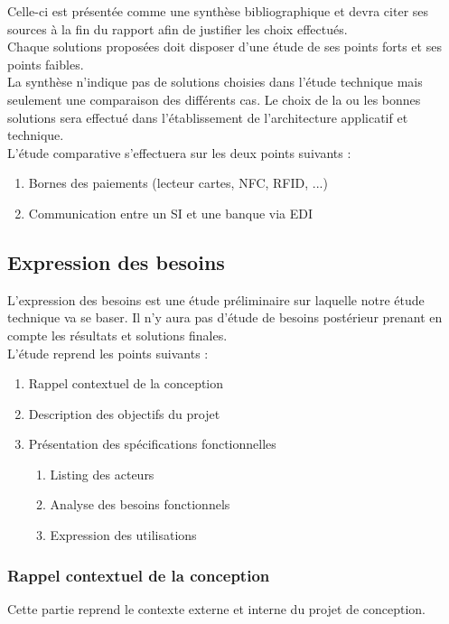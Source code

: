 Celle-ci est présentée comme une synthèse bibliographique et devra citer ses
sources à la fin du rapport afin de justifier les choix effectués. \\

Chaque solutions proposées doit disposer d'une étude de ses points forts et ses
points faibles. \\

La synthèse n'indique pas de solutions choisies dans l'étude technique mais
seulement une comparaison des différents cas. Le choix de la ou les bonnes
solutions sera effectué dans l'établissement de l'architecture applicatif et
technique. \\

L'étude comparative s'effectuera sur les deux points suivants :
\begin{enumerate}
  \item Bornes des paiements (lecteur cartes, NFC, RFID, ...)
  \item Communication entre un SI et une banque via EDI
\end{enumerate}

\subsection{Expression des besoins}
L'expression des besoins est une étude préliminaire sur laquelle notre étude
technique va se baser. Il n'y aura pas d'étude de besoins postérieur prenant en
compte les résultats et solutions finales. \\

L'étude reprend les points suivants :
\begin{enumerate}
  \item Rappel contextuel de la conception
  \item Description des objectifs du projet
  \item Présentation des spécifications fonctionnelles
    \begin{enumerate}
      \item Listing des acteurs
      \item Analyse des besoins fonctionnels
      \item Expression des utilisations
    \end{enumerate}
\end{enumerate}

\subsubsection{Rappel contextuel de la conception}
Cette partie reprend le contexte externe et interne du projet de conception. \\

